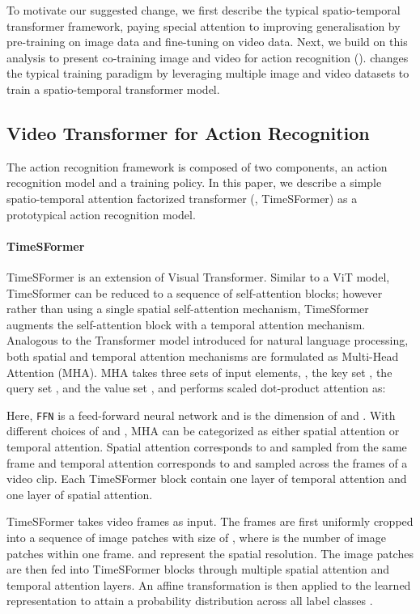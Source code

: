 
To motivate our suggested change, we first describe the typical spatio-temporal transformer framework, paying special attention to improving generalisation by pre-training on image data and fine-tuning on video data. Next, we build on this analysis to present co-training image and video for action recognition (\ourmethod). \ourmethod changes the typical training paradigm by leveraging multiple image and video datasets to train a spatio-temporal transformer model.


\subsection{Video Transformer for Action Recognition}
The action recognition framework is composed of two components, an action recognition model  and a training policy. In this paper, we describe a simple spatio-temporal attention factorized transformer (\ie, TimeSFormer\cite{bertasius2021space}) as a prototypical action recognition model.

\vspace{-10pt}
\paragraph{TimeSFormer}
TimeSFormer is an extension of Visual Transformer\cite{dosovitskiy2020image}. Similar to a ViT model, TimeSformer can be reduced to a sequence of self-attention blocks; however rather than using a single spatial self-attention mechanism, TimeSformer augments the self-attention block with a temporal attention mechanism. Analogous to the Transformer model introduced for natural language processing, both spatial and temporal attention mechanisms are formulated as Multi-Head Attention (MHA). MHA takes three sets of input elements, \ie, the key set , the query set , and the value set , and performs scaled dot-product attention as:

\vspace{-10pt}

Here, \texttt{FFN} is a feed-forward neural network and  is the dimension of  and . With different choices of  and , MHA can be categorized as either spatial attention or temporal attention. Spatial attention corresponds to  and  sampled from the same frame and temporal attention corresponds to  and  sampled across the frames of a video clip. Each TimeSFormer block contain one layer of temporal attention and one layer of spatial attention.

TimeSFormer takes  video frames  as input. The frames are first uniformly cropped into a sequence of image patches with size of , where  is the number of image patches within one frame.  and  represent the spatial resolution. The image patches are then fed into  TimeSFormer blocks through multiple spatial attention and temporal attention layers. An affine transformation is then applied to the learned representation  to attain a probability distribution across all label classes .

